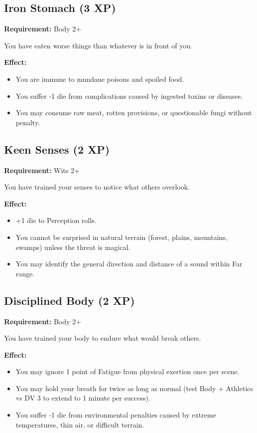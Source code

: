 \subsection{Iron Stomach (3 XP)}

\textbf{Requirement:} Body 2+

You have eaten worse things than whatever is in front of you.

\textbf{Effect:}
\begin{itemize}
\item You are immune to mundane poisons and spoiled food.
\item You suffer -1 die from complications caused by ingested toxins or diseases.
\item You may consume raw meat, rotten provisions, or questionable fungi without penalty.
\end{itemize}

\subsection{Keen Senses (2 XP)}

\textbf{Requirement:} Wits 2+

You have trained your senses to notice what others overlook.

\textbf{Effect:}
\begin{itemize}
\item +1 die to Perception rolls.
\item You cannot be surprised in natural terrain (forest, plains, mountains, swamps) unless the threat is magical.
\item You may identify the general direction and distance of a sound within Far range.
\end{itemize}

\subsection{Disciplined Body (2 XP)}

\textbf{Requirement:} Body 2+

You have trained your body to endure what would break others.

\textbf{Effect:}
\begin{itemize}
\item You may ignore 1 point of Fatigue from physical exertion once per scene.
\item You may hold your breath for twice as long as normal (test Body + Athletics vs DV 3 to extend to 1 minute per success).
\item You suffer -1 die from environmental penalties caused by extreme temperatures, thin air, or difficult terrain.
\end{itemize}


